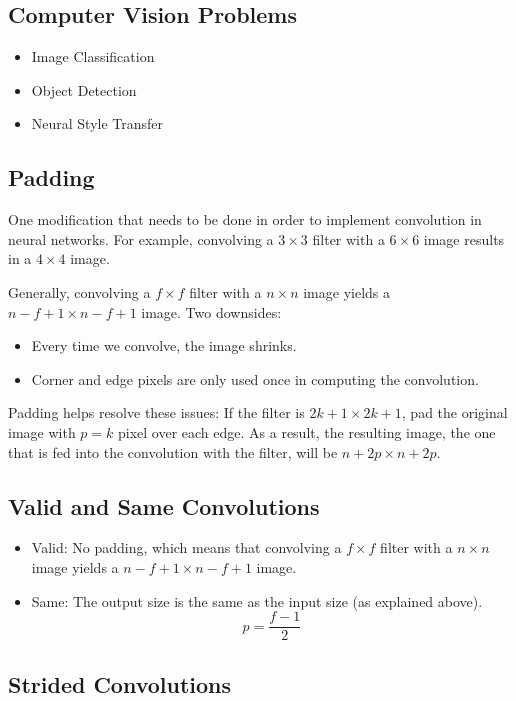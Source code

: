 \subsection{Computer Vision Problems}
\begin{itemize}
    \item Image Classification
    \item Object Detection
    \item Neural Style Transfer
\end{itemize}


\subsection{Padding}
One modification that needs to be done in order to implement convolution in neural networks. 
For example, convolving a $3\times 3$ filter with a $6\times 6$ image results in a $4\times 4$ image. 

Generally, convolving a $f\times f$ filter with a $n\times n$ image yields a $n-f+1\times n-f+1$ image. 
Two downsides: 
\begin{itemize}
    \item Every time we convolve, the image shrinks. 
    \item Corner and edge pixels are only used once in computing the convolution. 
\end{itemize}

Padding helps resolve these issues: 
If the filter is $2k+1\times 2k+1$, pad the original image with $p = k$ pixel over each edge. As a result, the resulting image, the one 
that is fed into the convolution with the filter, will be $n+2p\times n+2p$. 

\subsection{Valid and Same Convolutions}
\begin{itemize}
    \item Valid: No padding, which means that convolving a $f\times f$ filter with a $n\times n$ image yields a $n-f+1\times n-f+1$ image.
    \item Same: The output size is the same as the input size (as explained above).  
    $$
    p = \frac{f-1}{2}
    $$
\end{itemize}

\subsection{Strided Convolutions}

